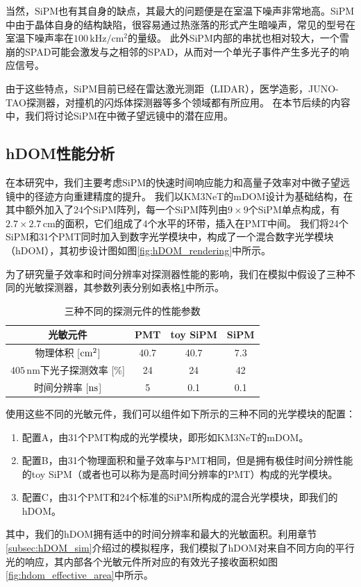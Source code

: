 当然，SiPM也有其自身的缺点，其最大的问题便是在室温下噪声非常地高。SiPM中由于晶体自身的结构缺陷，很容易通过热涨落的形式产生暗噪声，常见的型号在室温下噪声率在$100\,\mathrm{kHz/cm^2}$的量级。
此外SiPM内部的串扰也相对较大，一个雪崩的SPAD可能会激发与之相邻的SPAD，从而对一个单光子事件产生多光子的响应信号。

由于这些特点，SiPM目前已经在雷达激光测距（LIDAR）\cite{sipm_lidar:2013}，医学造影\cite{nuclear_medical_imaging:2009}，JUNO-TAO探测器\cite{JUNO-TAO:2023}，对撞机的闪烁体探测器\cite{SiPM_CEPC:2020}等多个领域都有所应用。
在本节后续的内容中，我们将讨论SiPM在中微子望远镜中的潜在应用。

\subsection{hDOM性能分析}

在本研究中，我们主要考虑SiPM的快速时间响应能力和高量子效率对中微子望远镜中的径迹方向重建精度的提升。
我们以KM3NeT的mDOM设计为基础结构\cite{KM3NeT_mDOM:2015}，在其中额外加入了24个SiPM阵列，每一个SiPM阵列由$9 \times 9$个SiPM单点构成，有$2.7\times 2.7\,\mathrm{cm}$的面积，它们组成了4个水平的环带，插入在PMT中间。
我们将24个SiPM和31个PMT同时加入到数字光学模块中，构成了一个混合数字光学模块（hDOM），其初步设计图如图\ref{fig:hDOM_rendering}中所示。

为了研究量子效率和时间分辨率对探测器性能的影响，我们在模拟中假设了三种不同的光敏探测器，其参数列表分别如表格\ref{tab:sensor_parameters}中所示。

\begin{table} [htbp]
    \centering
    \begin{tabular}{c|c|c|c}
        \hline
        光敏元件 & PMT & toy SiPM & SiPM  \\
        \hline
        物理体积 [$\rm{cm}^2$] & 40.7  & 40.7 & 7.3 \\
        \hline
        $405\,\mathrm{nm}$下光子探测效率 [\%] & 24 & 24 & 42 \\
        \hline
        时间分辨率 [$\rm{ns}$] & 5 & 0.1 & 0.1 \\
        \hline
    \end{tabular}
    \caption{三种不同的探测元件的性能参数}
    \label{tab:sensor_parameters}
\end{table}

使用这些不同的光敏元件，我们可以组件如下所示的三种不同的光学模块的配置：
\begin{enumerate}
    \item 配置A，由31个PMT构成的光学模块，即形如KM3NeT的mDOM。
    \item 配置B，由31个物理面积和量子效率与PMT相同，但是拥有极佳时间分辨性能的toy SiPM（或者也可以称为是高时间分辨率的PMT）构成的光学模块。
    \item 配置C，由31个PMT和24个标准的SiPM所构成的混合光学模块，即我们的hDOM。
\end{enumerate}
其中，我们的hDOM拥有适中的时间分辨率和最大的光敏面积。利用章节\ref{subsec:hDOM_sim}介绍过的模拟程序，我们模拟了hDOM对来自不同方向的平行光的响应，其内部各个光敏元件所对应的有效光子接收面积如图\ref{fig:hdom_effective_area}中所示。

